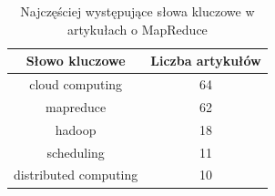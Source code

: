 	\begin{table}[t]
	\caption{Najczęściej występujące słowa kluczowe w artykułach o MapReduce}
	\label{tabela_bigdata}
		\begin{tabular}{|c|c|}
			\hline 
			Słowo kluczowe & Liczba artykułów\\
			\hline
			cloud computing & 64 \\
			\hline
			mapreduce & 62 \\
			\hline
			hadoop & 18 \\
			\hline
			scheduling & 11 \\
			\hline
			distributed computing & 10 \\
			\hline
		\end{tabular}
	\end{table}

